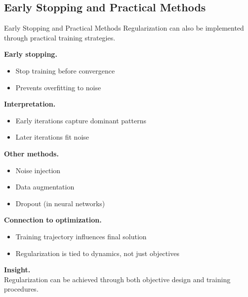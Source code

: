 \documentclass[aspectratio=169,11pt]{beamer}
\begin{document}
\subsection{Early Stopping and Practical Methods}
\begin{frame}[t,allowframebreaks]{Early Stopping and Practical Methods}
\small
Regularization can also be implemented through practical training strategies.

\textbf{Early stopping.}\\ \begin{itemize}
    \item Stop training before convergence
    \item Prevents overfitting to noise
\end{itemize}

\textbf{Interpretation.}\\ \begin{itemize}
    \item Early iterations capture dominant patterns
    \item Later iterations fit noise
\end{itemize}

\textbf{Other methods.}\\ \begin{itemize}
    \item Noise injection
    \item Data augmentation
    \item Dropout (in neural networks)
\end{itemize}

\textbf{Connection to optimization.}\\ \begin{itemize}
    \item Training trajectory influences final solution
    \item Regularization is tied to dynamics, not just objectives
\end{itemize}

\textbf{Insight.}\\ Regularization can be achieved through both objective design and training procedures.
\end{frame}
\end{document}
